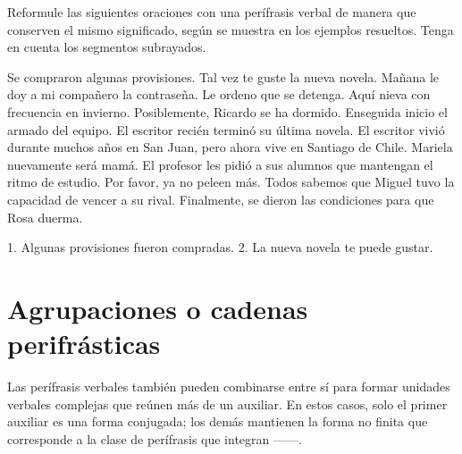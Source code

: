 \begin{ejercicio}\label{ej:11-reformular}
Reformule las siguientes oraciones con una perífrasis verbal de manera que
conserven el mismo significado, según se muestra en los ejemplos resueltos.
Tenga en cuenta los segmentos subrayados.

\begin{exe}
  \ex Se compraron algunas provisiones.
  \ex Tal vez te guste la nueva novela.
  \ex Mañana le doy a mi compañero la contraseña.
  \ex Le ordeno que se detenga.
  \ex Aquí nieva con frecuencia en invierno.
  \ex Posiblemente, Ricardo se ha dormido.
  \ex Enseguida inicio el armado del equipo.
  \ex El escritor recién terminó su última novela.
  \ex El escritor vivió durante muchos años en San Juan, pero ahora vive en
      Santiago de Chile.
  \ex Mariela nuevamente será mamá.
  \ex El profesor les pidió a sus alumnos que mantengan el ritmo de estudio.
  \ex Por favor, ya no peleen más.
  \ex Todos sabemos que Miguel tuvo la capacidad de vencer a su rival.
  \ex Finalmente, se dieron las condiciones para que Rosa duerma.
\end{exe}

\begin{resuelto}
1. Algunas provisiones fueron compradas. 2. La nueva novela te puede gustar.
\end{resuelto}
\end{ejercicio}

\section{Agrupaciones o cadenas perifrásticas}\label{sec:11-cadenas}

Las perífrasis verbales también pueden combinarse entre sí para formar unidades
verbales complejas que reúnen más de un auxiliar. En estos casos, solo el primer
auxiliar es una forma conjugada; los demás mantienen la forma no finita que
corresponde a la clase de perífrasis que integran ------.

